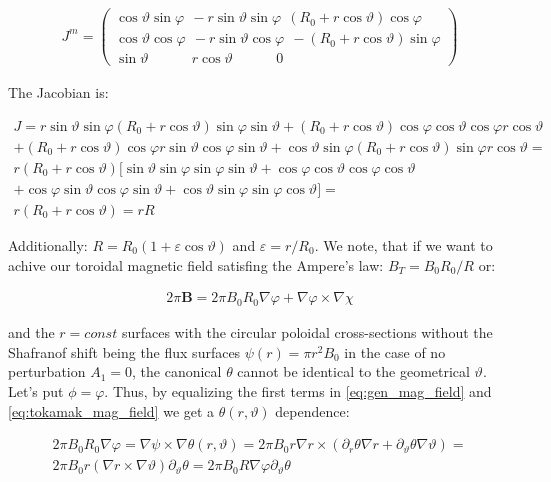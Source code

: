 \documentclass[11pt,a4paper,oneside]{article}
\begin{document}
\begin{align}
J^m=\begin{pmatrix} \cos{\vartheta}\sin{\varphi}\ \ -r\sin{\vartheta}\sin{\varphi}\ \ (R_0+r\cos{\vartheta})\cos{\varphi}\\
\cos{\vartheta}\cos{\varphi}\ \ -r\sin{\vartheta}\cos{\varphi}\ \ -(R_0+r\cos{\vartheta})\sin{\varphi}\\
\sin{\vartheta}\ \ \ \ \ \ \ \ \ \ \ \ \ \ r\cos{\vartheta}\ \ \ \ \ \ \ \ \ \ \ \ \ \ 0\end{pmatrix}
\end{align} 

The Jacobian is:

\begin{multline}
J=r\sin{\vartheta}\sin{\varphi}(R_0+r\cos{\vartheta})\sin{\varphi}\sin{\vartheta}+(R_0+r\cos{\vartheta})\cos{\varphi}\cos{\vartheta}\cos{\varphi}r\cos{\vartheta}\\
+(R_0+r\cos{\vartheta})\cos{\varphi}r\sin{\vartheta}\cos{\varphi}\sin{\vartheta}+\cos{\vartheta}\sin{\varphi}(R_0+r\cos{\vartheta})\sin{\varphi}r\cos{\vartheta}=\\
r(R_0+r\cos{\vartheta})[\sin{\vartheta}\sin{\varphi}\sin{\varphi}\sin{\vartheta}+\cos{\varphi}\cos{\vartheta}\cos{\varphi}\cos{\vartheta}\\
+\cos{\varphi}\sin{\vartheta}\cos{\varphi}\sin{\vartheta}+\cos{\vartheta}\sin{\varphi}\sin{\varphi}\cos{\vartheta}]=\\
r(R_0+r\cos{\vartheta})=rR
\end{multline} 

Additionally: $R=R_0(1+\varepsilon \cos{\vartheta})$ and $\varepsilon=r/R_0$. We note, that if we want to achive our toroidal magnetic field satisfing the Ampere's law: $B_T=B_0R_0/R$ or:

\begin{align}\label{eq:tokamak_mag_field}
2\pi\mathbf{B}=2\pi B_0R_0\nabla \varphi + \nabla \varphi \times \nabla \chi
\end{align}

and the $r=const$ surfaces with the circular poloidal cross-sections without the Shafranof shift being the flux surfaces $\psi (r) = \pi r^2 B_0$ in the case of no perturbation $A_1=0$, the canonical $\theta$ cannot be identical to the geometrical $\vartheta$. Let's put $\phi=\varphi$. Thus, by equalizing the first terms in \eqref{eq:gen_mag_field} and \eqref{eq:tokamak_mag_field} we get a $\theta(r,\vartheta)$ dependence: 

\begin{multline}
2\pi B_0R_0\nabla \varphi=\nabla \psi \times \nabla \theta (r,\vartheta)=2\pi B_0r\nabla r \times ( \partial_r \theta \nabla r+ \partial_\vartheta \theta \nabla \vartheta  )=\\
2\pi B_0r(\nabla r \times \nabla \vartheta)\partial_\vartheta \theta=2\pi B_0R \nabla \varphi\partial_\vartheta \theta
\end{multline}
\end{document}
